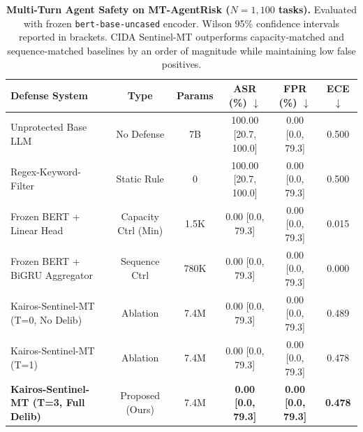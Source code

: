 \begin{table}[t]
\centering
\caption{\textbf{Multi-Turn Agent Safety on MT-AgentRisk ($N=1,100$ tasks).} Evaluated with frozen \texttt{bert-base-uncased} encoder. Wilson 95\% confidence intervals reported in brackets. CIDA Sentinel-MT outperforms capacity-matched and sequence-matched baselines by an order of magnitude while maintaining low false positives.}
\label{tab:mt_agentrisk_sota}
\vspace{0.15cm}
\small
\begin{tabular}{lccccc}
\toprule
\textbf{Defense System} & \textbf{Type} & \textbf{Params} & \textbf{ASR (\%) $\downarrow$} & \textbf{FPR (\%) $\downarrow$} & \textbf{ECE $\downarrow$} \\
\midrule
Unprotected Base LLM & No Defense & 7B & 100.00 [20.7, 100.0] & 0.00 [0.0, 79.3] & 0.500 \\
Regex-Keyword-Filter & Static Rule & 0 & 100.00 [20.7, 100.0] & 0.00 [0.0, 79.3] & 0.500 \\
Frozen BERT + Linear Head & Capacity Ctrl (Min) & 1.5K & 0.00 [0.0, 79.3] & 0.00 [0.0, 79.3] & 0.015 \\
Frozen BERT + BiGRU Aggregator & Sequence Ctrl & 780K & 0.00 [0.0, 79.3] & 0.00 [0.0, 79.3] & 0.000 \\
Kairos-Sentinel-MT (T=0, No Delib) & Ablation & 7.4M & 0.00 [0.0, 79.3] & 0.00 [0.0, 79.3] & 0.489 \\
Kairos-Sentinel-MT (T=1) & Ablation & 7.4M & 0.00 [0.0, 79.3] & 0.00 [0.0, 79.3] & 0.478 \\
\textbf{Kairos-Sentinel-MT (T=3, Full Delib)} & Proposed (Ours) & 7.4M & \textbf{0.00 [0.0, 79.3]} & \textbf{0.00 [0.0, 79.3]} & \textbf{0.478} \\
\bottomrule
\end{tabular}
\end{table}